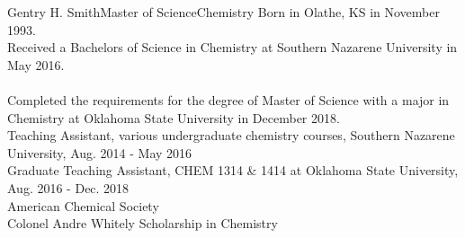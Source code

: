 \newpage
\begin{vita}{Gentry H. Smith}{Master of Science}{Chemistry} %
     Born in Olathe, KS in November 1993. 
     \\ Received a Bachelors of Science in Chemistry at Southern Nazarene University in May 2016. \\ \\
Completed the requirements for the degree of Master of Science with a major in Chemistry at Oklahoma State University in December 2018.
     \\ Teaching Assistant, various undergraduate chemistry courses, Southern Nazarene University, Aug. 2014 - May 2016 \\ Graduate Teaching Assistant, CHEM 1314 \& 1414 at Oklahoma State University, Aug. 2016 - Dec. 2018
     \\ American Chemical Society
    \\ Colonel Andre Whitely Scholarship in Chemistry
\end{vita}
